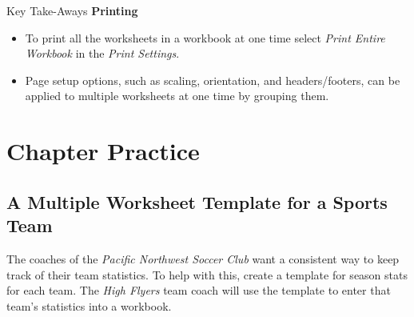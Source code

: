 \begin{center}
	\begin{tkwbox}{Key Take-Aways}
		\textbf{Printing}
		\\
		\begin{itemize}
			\setlength{\itemsep}{0pt}
			\setlength{\parskip}{0pt}
			\setlength{\parsep}{0pt}
			
			\item To print all the worksheets in a workbook at one time select \textit{Print Entire Workbook} in the \textit{Print Settings}.
			\item Page setup options, such as scaling, orientation, and headers/footers, can be applied to multiple worksheets at one time by grouping them.
			
		\end{itemize}
	\end{tkwbox}
\end{center}

\section{Chapter Practice}

\subsection{A Multiple Worksheet Template for a Sports Team}

The coaches of the \textit{Pacific Northwest Soccer Club} want a consistent way to keep track of their team statistics. To help with this, create a template for season stats for each team. The \textit{High Flyers} team coach will use the template to enter that team's statistics into a workbook.

